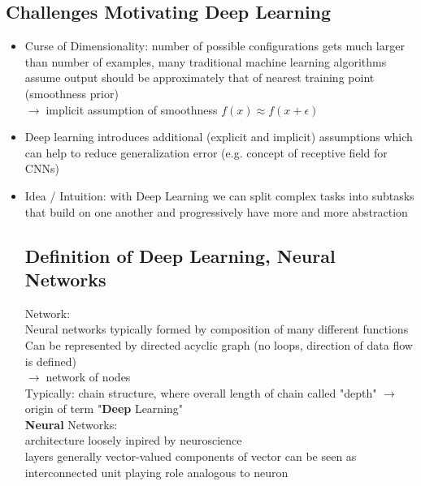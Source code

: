 \documentclass{article}
\newcommand{\arrow}{$\rightarrow\;$}
\begin{document}
\subsection{Challenges Motivating Deep Learning}
\begin{itemize}
    \item Curse of Dimensionality: number of possible configurations gets much larger than number of examples, 
    many traditional machine learning algorithms assume output should be approximately that of nearest training point (smoothness prior)\\
    \arrow implicit assumption of smoothness $f(x) \approx f(x + \epsilon)$
    \item Deep learning introduces additional (explicit and implicit) assumptions which can help to reduce generalization error (e.g. concept of receptive field for CNNs)
    \item Idea / Intuition: with Deep Learning we can split complex tasks into subtasks that build on one another and progressively have more and more abstraction
    
\subsection{Definition of Deep Learning, Neural Networks}
Network:\\
Neural networks typically formed by composition of many different functions \\
Can be represented by directed acyclic graph (no loops, direction of data flow is defined) \\
\arrow network of nodes \\
Typically: chain structure, where overall length of chain called "depth" \arrow origin of term "\textbf{Deep} Learning" \\
\textbf{Neural} Networks: \\
architecture loosely inpired by neuroscience \\
layers generally vector-valued components of vector can be seen as interconnected unit playing role analogous to neuron 

\end{itemize}
\end{document}
